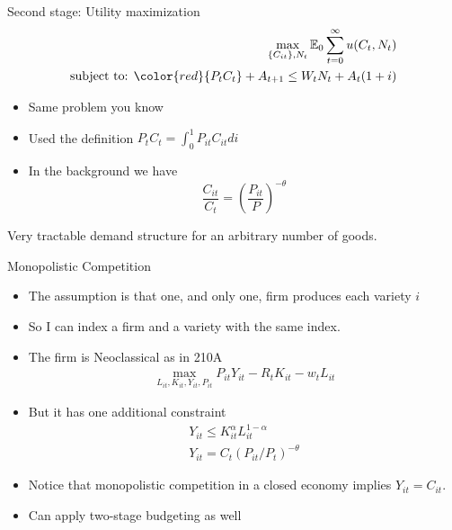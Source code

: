 \documentclass[11pt,aspectratio=169,xcolor={dvipsnames},hyperref={pdftex,pdfpagemode=UseNone,hidelinks,pdfdisplaydoctitle=true},usepdftitle=false]{beamer}
\begin{document}
\begin{frame}{Second stage: Utility maximization}
\begin{align*}
\max_{\{C_{it}\},N_t } \mathbb{E}_0 \sum_{t=0}^{\infty} u(C_t,N_t)\\
\text{subject to:   } {\color{red}{P_tC_t}} + A_{t+1} \leq W_t N_t +  A_t(1+i)
\end{align*}
\begin{itemize}
\item Same problem you know
\item Used the definition $P_t C_t = \int_0^1 P_{it} C_{it} di$
\item In the background we have $$\frac{C_{it}}{C_{t}} = \left(\frac{P_{it}}{P}\right)^{-\theta}$$
\end{itemize}
Very tractable demand structure for an arbitrary number of goods.
\end{frame}


\begin{frame}{Monopolistic Competition}
\begin{itemize}
\item The assumption is that one, and only one, firm produces each variety $i$
\item So I can index a firm and a variety with the same index.
\item The firm is Neoclassical as in 210A
\begin{align*}
\max_{L_{it},K_{it},Y_{it},P_{it}} P_{it} Y_{it} - R_t K_{it} - w_t L_{it}
\end{align*}
\item But it has one additional constraint
\begin{align*}
Y_{it} \leq K_{it}^{\alpha}L_{it}^{1-\alpha}\\
Y_{it} = C_t \left(P_{it}/P_t\right)^{-\theta}
\end{align*}
\item Notice that monopolistic competition in a closed economy implies $Y_{it} = C_{it}$.
\item Can apply two-stage budgeting as well
\end{itemize}
\end{frame}
\end{document}
